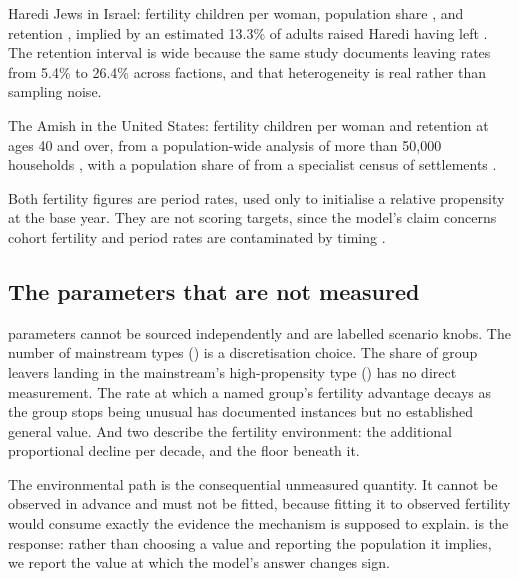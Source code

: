 Haredi Jews in Israel: fertility \HarediFertility{} children per woman,
population share \HarediShare{}, and retention \HarediRetention{}, implied by an
estimated 13.3\% of adults raised Haredi having left \citep{regev2020,idi2024}.
The retention interval is wide because the same study documents leaving rates
from 5.4\% to 26.4\% across factions, and that heterogeneity is real rather than
sampling noise.

The Amish in the United States: fertility \AmishFertility{} children per woman and
retention \AmishRetention{} at ages 40 and over, from a population-wide analysis
of more than 50{,}000 households \citep{anderson2025}, with a population share of
\AmishShare{} from a specialist census of settlements \citep{youngcenter2024}.

Both fertility figures are period rates, used only to initialise a relative
propensity at the base year. They are not scoring targets, since the model's
claim concerns cohort fertility and period rates are contaminated by timing
\citep{bongaarts1998}.

\subsection{The parameters that are not measured}

\MechanismKnobCount{} parameters cannot be sourced independently and are labelled
scenario knobs. The number of mainstream types (\MainstreamTypes{}) is a
discretisation choice. The share of group leavers landing in the mainstream's
high-propensity type (\DefectorWeight{}) has no direct measurement. The rate at
which a named group's fertility advantage decays as the group stops being unusual
has documented instances but no established general value. And two describe the
fertility environment: the additional proportional decline per decade, and the
floor beneath it.

The environmental path is the consequential unmeasured quantity. It cannot be
observed in advance and must not be fitted, because
fitting it to observed fertility would consume exactly the evidence the mechanism
is supposed to explain.  is the response: rather than choosing
a value and reporting the population it implies, we report the value at which the
model's answer changes sign.
